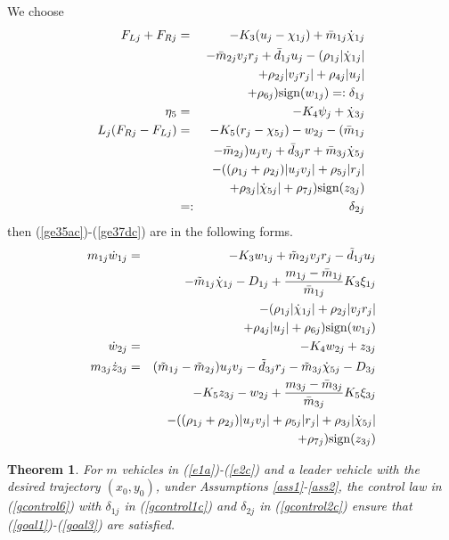 \documentclass[letterpaper, 10 pt, conference]{ieeeconf}  %
\newtheorem{theorem}{Theorem}
\begin{document}
We choose
\begin{eqnarray}
F_{Lj}+F_{Rj}&=&-K_{3}(u_j-\chi_{1j})+\bar{m}_{1j}\dot{{\chi}}_{1j}\nonumber\\
&&-\bar{m}_{2j}v_jr_j+\bar{d}_{1j}u_j-(\rho_{1j}|\dot{{\chi}}_{1j}|\nonumber\\
&&+\rho_{2j}|v_jr_j|+\rho_{4j}|u_j|\nonumber\\
&&+\rho_{6j}){\rm sign}(w_{1j})=:\delta_{1j}\label{gcontrol1c}\\
\eta_5&=&-K_4\psi_{j}+\dot{\chi}_{3j}\label{geta5jc}\\
L_j(F_{Rj}-F_{Lj})&=&-K_5(r_j-\chi_{5j})-w_{2j}-(\bar{m}_{1j}\nonumber\\
&&-\bar{m}_{2j})u_jv_j+\bar{d}_{3j}r+\bar{m}_{3j}\dot{{\chi}}_{5j}\nonumber\\
&&-((\rho_{1j}+\rho_{2j})|u_jv_j|+\rho_{5j}|r_j|\nonumber\\
&&+\rho_{3j}|\dot{{\chi}}_{5j}|+\rho_{7j}){\rm sign}(z_{3j})\nonumber\\
&=:&\delta_{2j}\label{gcontrol2c}
\end{eqnarray}
then (\ref{ge35ac})-(\ref{ge37dc}) are in the following forms.
\begin{eqnarray}
m_{1j}\dot{w}_{1j}&=&-K_3w_{1j}+\tilde{m}_{2j}v_jr_j-\tilde{d}_{1j}u_j\nonumber\\
&&-\tilde{m}_{1j}\dot{\chi}_{1j}-D_{1j}+\frac{m_{1j}-\bar{m}_{1j}}{\bar{m}_{1j}}K_3\xi_{1j} \nonumber\\
&&-(\rho_{1j}|\dot{{\chi}}_{1j}|+\rho_{2j}|v_jr_j|\nonumber\\
&&+\rho_{4j}|u_j|+\rho_{6j}){\rm sign}(w_{1j})\label{ge35acd}\\
\dot{w}_{2j}
&=&-K_4w_{2j}+z_{3j}\label{ge37acd}\\
m_{3j}\dot{z}_{3j}&=&(\tilde{m}_{1j}-\tilde{m}_{2j})u_jv_j-\tilde{d}_{3j}r_j-\tilde{m}_{3j}\dot{\chi}_{5j}-D_{3j}\nonumber\\
&&-K_5z_{3j}-w_{2j}+\frac{m_{3j}-\bar{m}_{3j}}{\bar{m}_{3j}}K_5{\xi}_{3j}\nonumber\\
&&-((\rho_{1j}
+\rho_{2j})|u_jv_j|+\rho_{5j}|r_j|+\rho_{3j}|\dot{{\chi}}_{5j}|\nonumber\\
&&+\rho_{7j}){\rm sign}(z_{3j}) \label{ge37dcd}
\end{eqnarray}

\begin{theorem}
For $m$ vehicles in (\ref{e1a})-(\ref{e2c}) and a leader vehicle with the desired trajectory
$(x_0,y_0)$, under Assumptions \ref{ass1}-\ref{ass2}, the control
law in (\ref{gcontrol6}) with $\delta_{1j}$ in (\ref{gcontrol1c}) and $\delta_{2j}$ in (\ref{gcontrol2c}) ensure that (\ref{goal1})-(\ref{goal3}) are satisfied.
\label{the2}
\end{theorem}
\end{document}
